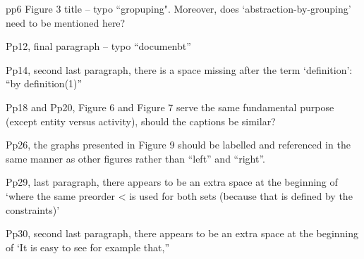 \documentclass{article}
\begin{document}
pp6 Figure 3 title – typo “gropuping".  Moreover, does ‘abstraction-by-grouping’ need to 
be mentioned here?

Pp12, final paragraph – typo “documenbt”

Pp14, second last paragraph, there is a space missing after the term ‘definition’: “by definition(1)”

Pp18 and Pp20, Figure 6 and Figure 7 serve the same fundamental purpose (except entity versus activity), should the captions be similar?

Pp26, the graphs presented in Figure 9 should be labelled and referenced in the same manner as other figures rather than “left” and “right”.

Pp29, last paragraph, there appears to be an extra space at the beginning of ‘where the same preorder < is used for both sets (because that is defined by the constraints)’

Pp30, second last paragraph, there appears to be an extra space at the beginning of ‘It is easy to see for example that,”






\end{document}

